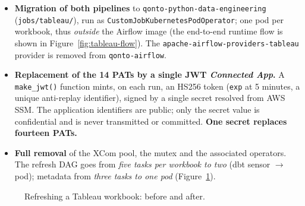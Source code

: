 \begin{itemize}
  \item \textbf{Migration of both pipelines} to \texttt{qonto-python-data-engineering} (\texttt{jobs/tableau/}), run as \texttt{CustomJobKubernetesPodOperator}; one pod per workbook, thus \emph{outside} the Airflow image (the end-to-end runtime flow is shown in Figure~\ref{fig:tableau-flow}). The \texttt{apache-airflow-providers-tableau} provider is removed from \texttt{qonto-airflow}.
  \item \textbf{Replacement of the 14 PATs by a single JWT \emph{Connected App}.} A \texttt{make\_jwt()} function mints, on each run, an HS256 token (\texttt{exp} at 5 minutes, a unique anti-replay identifier), signed by a single secret resolved from AWS SSM. The application identifiers are public; only the secret value is confidential and is never transmitted or committed. \textbf{One secret replaces fourteen PATs.}
  \item \textbf{Full removal} of the XCom pool, the mutex and the associated operators. The refresh DAG goes from \emph{five tasks per workbook to two} (dbt sensor $\rightarrow$ pod); metadata from \emph{three tasks to one pod} (Figure~\ref{fig:tableau-ba}).
\end{itemize}

\begin{figure}[H]
\centering
{}
\caption{Refreshing a Tableau workbook: before and after.}
\label{fig:tableau-ba}
\end{figure}

